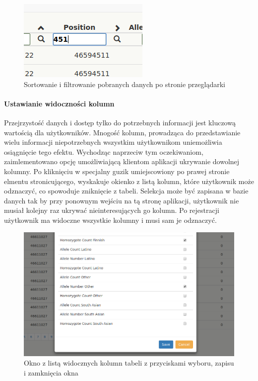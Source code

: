\documentclass[a4paper,12pt,twoside]{article}
\begin{document}
\begin{figure}[h]
\centering
\includegraphics{obrazy/aplikacja/sortingAndSearch.png}
\caption{Sortowanie i filtrowanie pobranych danych po stronie przeglądarki}
\label{fig:sortingAndSearchpic}
\end{figure}

\newpage
\paragraph{Ustawianie widoczności kolumn}
Przejrzystość danych i dostęp tylko do potrzebnych informacji jest kluczową wartością dla użytkowników.
Mnogość kolumn, prowadząca do przedstawianie wielu informacji niepotrzebnych
wszystkim użytkownikom uniemożliwia osiągnięcie tego efektu. Wychodząc naprzeciw tym oczekiwaniom,
zaimlementowano opcję umożliwiającą klientom aplikacji ukrywanie dowolnej kolumny.
Po kliknięciu w specjalny guzik umiejscowiony po prawej stronie elmentu stronicującego, wyskakuje okienko z listą kolumn,
które użytkownik może odznaczyć, co spowoduje zniknięcie z tabeli. Selekcja może być zapisana
w bazie danych tak by przy ponownym wejściu na tą stronę aplikacji, użytkownik nie musiał
kolejny raz ukrywać nieinteresujących go kolumn. Po rejestracji użytkownik ma widoczne wszystkie
kolumny i musi sam je odznaczyć.

\begin{figure}[h]
\includegraphics[width=\linewidth]{obrazy/aplikacja/visible_columns.png}
\caption{Okno z listą widocznych kolumn tabeli z przyciskami wyboru, zapisu i zamknięcia okna}
\label{fig:visible_columnspic}
\end{figure}
\end{document}
